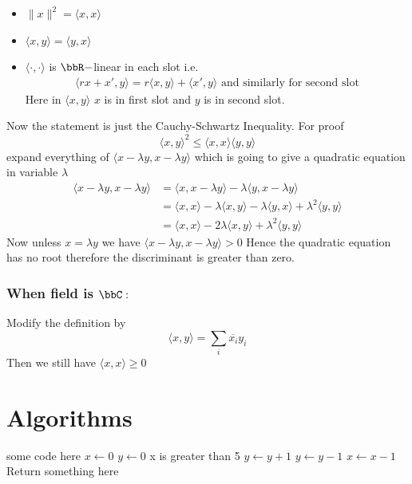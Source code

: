 \documentclass{report}
\begin{document}
{	\begin{note}
		\begin{itemize}
			\item $\|x\|^2=\langle x,x\rangle$
			\item $\langle x,y\rangle=\langle y,x\rangle$
			\item $\langle \cdot,\cdot\rangle$ is $\bbR-$linear in each slot i.e. \begin{align*}
				      \langle rx+x',y\rangle=r\langle x,y\rangle+\langle x',y\rangle	\text{ and similarly for second slot}
			      \end{align*}Here in $\langle x,y\rangle$ $x$ is in first slot and $y$ is in second slot.
		\end{itemize}
	\end{note}Now the statement is just the Cauchy-Schwartz Inequality. For proof $$\langle x,y\rangle^2\leq \langle x,x\rangle\langle y,y\rangle $$ expand everything of $\langle x-\lambda y,x-\lambda y\rangle$ which is going to give a quadratic equation in variable $\lambda $ \begin{align*}
		\langle x-\lambda y,x-\lambda y\rangle & =\langle x,x-\lambda y\rangle-\lambda\langle y,x-\lambda y\rangle                                       \\
		                                       & =\langle x ,x\rangle -\lambda\langle x,y\rangle -\lambda\langle y,x\rangle +\lambda^2\langle y,y\rangle \\
		                                       & =\langle x,x\rangle -2\lambda\langle x,y\rangle+\lambda^2\langle y,y\rangle
	\end{align*}Now unless $x=\lambda y$ we have $\langle x-\lambda y,x-\lambda y\rangle>0$ Hence the quadratic equation has no root therefore the discriminant is greater than zero.

	\subsubsection*{\textbf{When field is $\bbC:$}}Modify the definition by $$\langle x,y\rangle=\sum_i\overline{x_i}y_i$$Then we still have $\langle x,x\rangle\geq 0$}

\section{Algorithms}
\begin{algorithm}[H]
\SetAlgoLined
\SetNoFillComment
{}
\vspace{3mm}
some code here\;
$x \leftarrow 0$\;
$y \leftarrow 0$\;
 {
    x is greater than 5 
}
 {
    $y \leftarrow y + 1$\;
}
 {
    $y \leftarrow y - 1$\;
}
 {
    $x \leftarrow x - 1$\;
}
\Return Return something here\;
\caption{what}
\end{algorithm}
\end{document}
